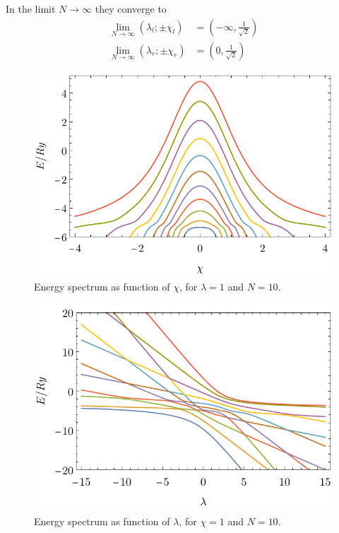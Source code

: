 In the limit $N\rightarrow\infty$ they converge to
\begin{align*}
    \lim_{N\rightarrow \infty}(\lambda_l ;\pm\chi_l)&= \left(-\infty,\frac{1}{\sqrt{2}}\right)\\
    \lim_{N\rightarrow \infty}(\lambda_r ;\pm\chi_r)&= \left(0,\frac{1}{\sqrt{2}}\right)
\end{align*}

\begin{figure}[h]
    \centering
    \includegraphics{../img/N=10_energiesl.pdf}
    \caption{Energy spectrum as function of $\chi$, for $\lambda=1$ and $N=10$.}
    \label{fig:N=10_energiesl}    
\end{figure}
\begin{figure}[h]
    \centering
    \includegraphics{../img/N=10_energies2.pdf}
    \caption{Energy spectrum as function of $\lambda$, for $\chi=1$ and $N=10$.}
    \label{fig:N=10_energies2}    
\end{figure}

